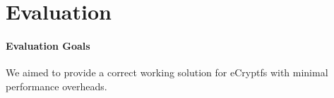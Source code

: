 \section{Evaluation}
\label{eval}

%
%
%
%
%
%
%
%
%
%
%
%
%
%
%
%
%
%
%



\paragraph{Evaluation Goals}
We aimed to provide a correct working solution for eCryptfs with minimal
performance overheads.

